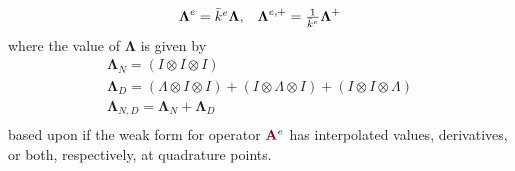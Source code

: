 \begin{definition}
\begin{equation}
\begin{array}{c c}
\boldsymbol{\Lambda}^e = \bar{k}^e \boldsymbol{\Lambda},  &  \boldsymbol{\Lambda}^{e, +} = \frac{1}{\bar{k}^e} \boldsymbol{\Lambda}^{+}
\end{array}
\end{equation}
where the value of $\mathbf{\Lambda}$ is given by
\begin{equation}
\begin{array}{c}
\boldsymbol{\Lambda}_N      = \left( I \otimes I \otimes I \right)  \\
\boldsymbol{\Lambda}_D      = \left( \Lambda \otimes I \otimes I\right) + \left( I \otimes \Lambda \otimes I\right) + \left( I \otimes I \otimes \Lambda \right)  \\
\boldsymbol{\Lambda}_{N, D} = \boldsymbol{\Lambda}_N + \boldsymbol{\Lambda}_D  \\
\end{array}
\end{equation}
based upon if the weak form for operator ${\color{burgundy}\mathbf{A}}^e$ has interpolated values, derivatives, or both, respectively, at quadrature points.
\end{definition}
